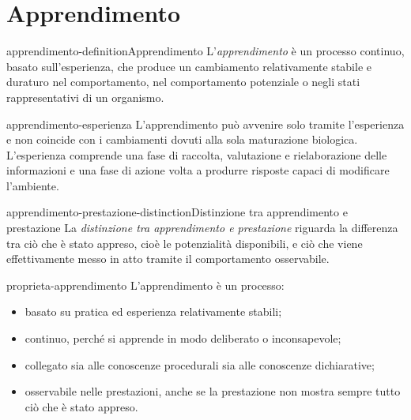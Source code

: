\documentclass[preview]{standalone}
\begin{document}
\genpage

\section{Apprendimento}

\begin{snippetdefinition}{apprendimento-definition}{Apprendimento}
    L'\emph{apprendimento} è un processo continuo, basato sull'esperienza, che
    produce un cambiamento relativamente stabile e duraturo nel comportamento,
    nel comportamento potenziale o negli stati rappresentativi di un organismo.
\end{snippetdefinition}

\begin{snippet}{apprendimento-esperienza}
    L'apprendimento può avvenire solo tramite l'esperienza e non coincide con i
    cambiamenti dovuti alla sola maturazione biologica. L'esperienza comprende
    una fase di raccolta, valutazione e rielaborazione delle informazioni e una
    fase di azione volta a produrre risposte capaci di modificare l'ambiente.
\end{snippet}


\begin{snippetdefinition}{apprendimento-prestazione-distinction}{Distinzione tra apprendimento e prestazione}
    La \emph{distinzione tra apprendimento e prestazione} riguarda la differenza
    tra ciò che è stato appreso, cioè le potenzialità disponibili, e ciò che
    viene effettivamente messo in atto tramite il comportamento osservabile.
\end{snippetdefinition}

\begin{snippet}{proprieta-apprendimento}
    L'apprendimento è un processo:
    \begin{itemize}
        \item basato su pratica ed esperienza relativamente stabili;
        \item continuo, perché si apprende in modo deliberato o inconsapevole;
        \item collegato sia alle conoscenze procedurali sia alle conoscenze
        dichiarative;
        \item osservabile nelle prestazioni, anche se la prestazione non mostra
        sempre tutto ciò che è stato appreso.
    \end{itemize}
\end{snippet}
\end{document}
